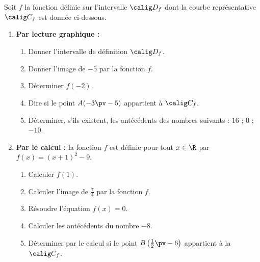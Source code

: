 \documentclass[10pt,openright,twoside,french]{book}
\begin{document}

\exo Soit $f$ la fonction définie sur l'intervalle $\calig D_f$ dont la courbe représentative $\calig C_f$ est donnée ci-dessous.

\begin{center}
\end{center}

\begin{enumerate}
    \item \textbf{Par lecture graphique :}
    \begin{enumerate}
        \item Donner l'intervalle de définition $\calig D_f$.
        \item Donner l'image de $-5$ par la fonction $f$.
        \item Déterminer $f(-2)$.
        \item Dire si le point $A(-3 \pv -5)$ appartient à $\calig C_f$.
        \item Déterminer, s'ils existent, les antécédents des nombres suivants : $16$ ; $0$ ; $-10$.
    \end{enumerate}
    \item \textbf{Par le calcul :} la fonction $f$ est définie pour tout $x \in \R$ par $f(x) = (x + 1)^2 - 9$.
    \begin{enumerate}
        \item Calculer $f(1)$.
        \item Calculer l'image de $\frac 74$ par la fonction $f$.
        \item Résoudre l'équation $f(x) = 0$.
        \item Calculer les antécédents du nombre $-8$.
        \item Déterminer par le calcul si le point $B\left(\frac12 \pv -6\right)$ appartient à la $\calig C_f$.
    \end{enumerate}
\end{enumerate}
\end{document}
